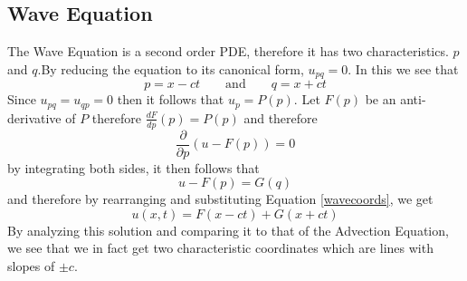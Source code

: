 \subsection{Wave Equation}
The Wave Equation is a second order PDE, therefore it has two characteristics. $p$ and
$q$.By reducing the equation to its canonical form, $u_{pq} = 0$. In this we see that 
\begin{equation} \label{wavecoords}
p = x-ct \qquad \text{and} \qquad q = x + ct
\end{equation}
Since $u_{pq} = u_{qp} = 0$ then it follows that $u_p = P(p)$. Let $F(p)$ be an anti-derivative of $P$ therefore $\frac{dF}{dp}(p) = P(p)$ and therefore 
\begin{equation}
\frac{\partial}{\partial p}(u - F(p)) = 0
\end{equation}
by integrating both sides, it then follows that
\begin{equation}
u - F(p) = G(q)
\end{equation}
and therefore by rearranging and substituting Equation \ref{wavecoords}, we get
\begin{equation}
u(x,t) = F(x-ct) + G(x+ct)
\end{equation}
By analyzing this solution and comparing it to that of the Advection Equation, we see that we in fact get two characteristic coordinates which are lines with slopes of $\pm c$.
